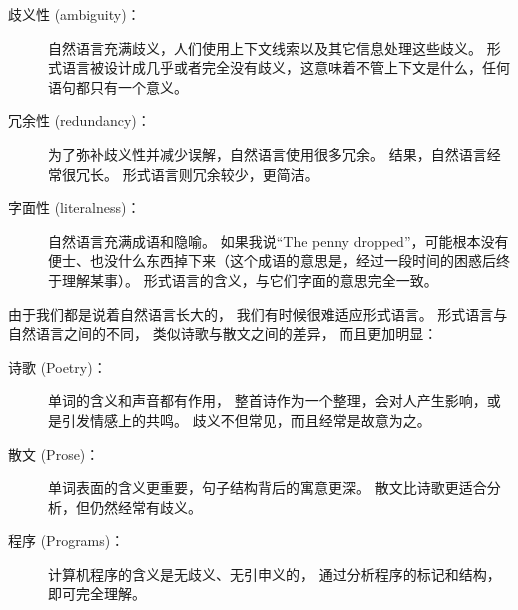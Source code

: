 \begin{description}

\item[歧义性 (ambiguity)：] 自然语言充满歧义，人们使用上下文线索以及其它信息处理这些歧义。 形式语言被设计成几乎或者完全没有歧义，这意味着不管上下文是什么，任何语句都只有一个意义。

\item[冗余性 (redundancy)：] 为了弥补歧义性并减少误解，自然语言使用很多冗余。 结果，自然语言经常很冗长。 形式语言则冗余较少，更简洁。

\item[字面性 (literalness)：] 自然语言充满成语和隐喻。 如果我说``The penny dropped''，可能根本没有便士、也没什么东西掉下来（这个成语的意思是，经过一段时间的困惑后终于理解某事）。 形式语言的含义，与它们字面的意思完全一致。

\end{description}


由于我们都是说着自然语言长大的， 我们有时候很难适应形式语言。  
形式语言与自然语言之间的不同， 类似诗歌与散文之间的差异， 而且更加明显：

 


\begin{description}

\item[诗歌 (Poetry)：] 单词的含义和声音都有作用， 整首诗作为一个整理，会对人产生影响，或是引发情感上的共鸣。  歧义不但常见，而且经常是故意为之。

\item[散文 (Prose)：] 单词表面的含义更重要，句子结构背后的寓意更深。  散文比诗歌更适合分析，但仍然经常有歧义。

\item[程序 (Programs)：] 计算机程序的含义是无歧义、无引申义的， 通过分析程序的标记和结构，即可完全理解。

\end{description}

